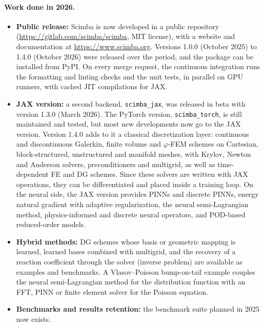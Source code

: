 \paragraph{Work done in 2026.}
\begin{itemize}
    \item \textbf{Public release:} Scimba is now developed in a public repository
          (\href{https://gitlab.com/scimba/scimba}{https://gitlab.com/scimba/scimba}, MIT license),
          with a website and documentation at \href{https://www.scimba.org}{https://www.scimba.org}.
          Versions 1.0.0 (October 2025) to 1.4.0 (October 2026) were released over the period,
          and the package can be installed from PyPI.
          On every merge request, the continuous integration runs the formatting and linting checks
          and the unit tests, in parallel on GPU runners, with cached JIT compilations for JAX.
    \item \textbf{JAX version:} a second backend, \texttt{scimba\_jax}, was released in beta with version 1.3.0 (March 2026).
          The PyTorch version, \texttt{scimba\_torch}, is still maintained and tested,
          but most new developments now go to the JAX version.
          Version 1.4.0 adds to it a classical discretization layer:
          continuous and discontinuous Galerkin, finite volume and $\varphi$-FEM schemes
          on Cartesian, block-structured, unstructured and manifold meshes,
          with Krylov, Newton and Anderson solvers, preconditioners and multigrid,
          as well as time-dependent FE and DG schemes.
          Since these solvers are written with JAX operations, they can be differentiated
          and placed inside a training loop.
          On the neural side, the JAX version provides PINNs and discrete PINNs,
          energy natural gradient with adaptive regularization, the neural semi-Lagrangian method,
          physics-informed and discrete neural operators, and POD-based reduced-order models.
    \item \textbf{Hybrid methods:} DG schemes whose basis or geometric mapping is learned,
          learned bases combined with multigrid, and the recovery of a reaction coefficient
          through the solver (inverse problem) are available as examples and benchmarks.
          A Vlasov--Poisson bump-on-tail example couples the neural semi-Lagrangian method
          for the distribution function with an FFT, PINN or finite element solver for the Poisson equation.
    \item \textbf{Benchmarks and results retention:} the benchmark suite planned in 2025 now exists.

\end{itemize}
